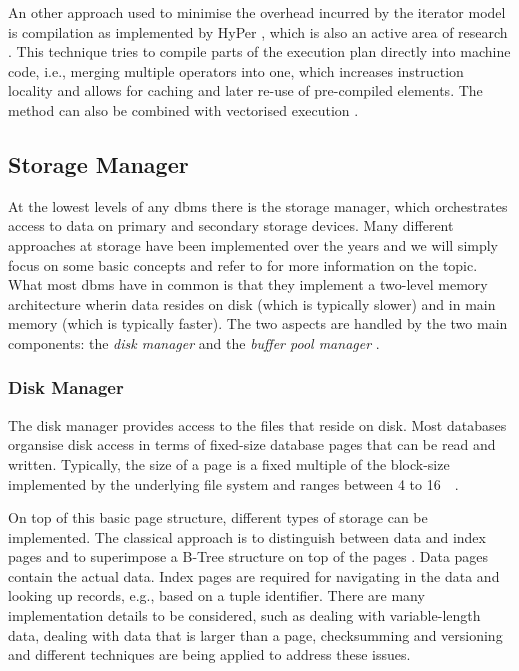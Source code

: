 An other approach used to minimise the overhead incurred by the iterator model is compilation as implemented by HyPer \cite{Neumann:2014Compiling}, which is also an active area of research \cite{Krolik:2021r3d3,Funke:2021Low}. This technique tries to compile parts of the execution plan directly into machine code, i.e., merging multiple operators into one, which increases instruction locality and allows for caching and later re-use of pre-compiled elements. The method can also be combined with vectorised execution \cite{Sompolski:2011Vectorization,Rosenfeld:2022Query}.

\subsection{Storage Manager}

At the lowest levels of any \acrshort{dbms} there is the storage manager, which orchestrates access to data on primary and secondary storage devices. Many different approaches at storage have been implemented over the years and we will simply focus on some basic concepts and refer to \cite{Petrov:2019Database} for more information on the topic. What most \acrshort{dbms} have in common is that they implement a two-level memory architecture wherin data resides on disk (which is typically slower) and in main memory (which is typically faster). The two aspects are handled by the two main components: the \emph{disk manager} and the \emph{buffer pool manager} \cite{Petrov:2019Database}.

\subsubsection{Disk Manager}
The disk manager provides access to the files that reside on disk. Most databases organsise disk access in terms of fixed-size database pages that can be read and written. Typically, the size of a page is a fixed multiple of the block-size implemented by the underlying file system and ranges between 4 to \SI{16}{\kilo\byte}.

On top of this basic page structure, different types of storage can be implemented. The classical approach is to distinguish between data and index pages and to superimpose a B-Tree structure on top of the pages \cite{Bayer:2002Organization}. Data pages contain the actual data. Index pages are required for navigating in the data and looking up records, e.g., based on a tuple identifier. There are many implementation details to be considered, such as dealing with variable-length data, dealing with data that is larger than a page, checksumming and versioning and different techniques are being applied to address these issues.

